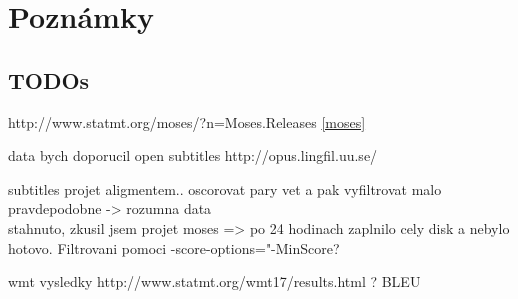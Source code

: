 





\chapter{Poznámky} \label{kapitola:poznamky}

\section{TODOs}
http://www.statmt.org/moses/?n=Moses.Releases \ref{moses}

data bych doporucil open subtitles http://opus.lingfil.uu.se/

subtitles projet aligmentem.. oscorovat pary vet a pak vyfiltrovat malo pravdepodobne -> rozumna data\\
stahnuto, zkusil jsem projet moses => po 24 hodinach zaplnilo cely disk a nebylo hotovo. Filtrovani pomoci  -score-options="-MinScore?

wmt vysledky http://www.statmt.org/wmt17/results.html ? BLEU


